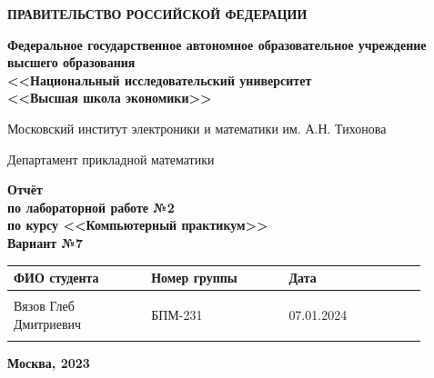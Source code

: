 \documentclass[12pt]{article}
\begin{document}
\thispagestyle{empty}
\begin{center}
\textbf{ПРАВИТЕЛЬСТВО РОССИЙСКОЙ ФЕДЕРАЦИИ}

\vspace{5ex}
	
\textbf{Федеральное государственное автономное образовательное учреждение \\ высшего образования \\ <<Национальный исследовательский университет \\ <<Высшая школа экономики>>}
\end{center}
\vspace{5ex}

\begin{center}
    Московский институт электроники и математики им. А.Н. Тихонова  
    
    \vspace{5ex}
    
    Департамент прикладной математики
    
    \vspace{10ex}
    \textbf{Отчёт \\ по лабораторной работе №2 \\ по курсу <<Компьютерный практикум>> \\ Вариант №7}
	\vspace{7ex}

\end{center}

\begin{center} 
\begin{tabular}{| p{0.3\linewidth}| p{0.3\linewidth}| p{0.3\linewidth}|}
 \hline	
ФИО студента & Номер группы & Дата \\  \hline
 & & \\  
Вязов Глеб \newline Дмитриевич & БПМ-231 & 07.01.2024\\  
 & & \\  \hline		
\end{tabular}
\end{center}

\begin{center}
	\vspace{3ex}
	
	\vfill
   
   \normalsize
    
	\textbf{Москва, 2023}
\end{center}

\newpage
\end{document}

